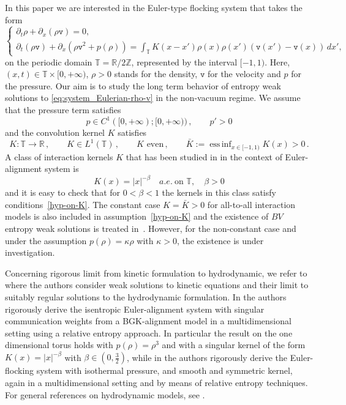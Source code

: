 \documentclass[10pt,reqno]{amsart}
\DeclareMathOperator*{\essinf}{ess\,inf}
\newcommand{\bbt} {\mathbb T}
\newcommand{\R}{\mathbb{R}}
\newcommand{\Z}{\mathbb{Z}}
\newcommand{\vv}{\mathtt v}
\begin{document}
In this paper we are interested in the Euler-type flocking system that takes the form
\begin{equation}\label{eq:system_Eulerian-rho-v}
    \begin{cases}
        \partial_t\rho +  \partial_x (\rho \vv) 
= 0, &\\
\partial_t (\rho\vv)
+  \partial_x \left(\rho\vv^2 + p(\rho) \right) =  \int_\bbt K(x-x')\rho(x)\rho(x')\left(\vv(x')  - \vv(x) \right)
\,dx',
    \end{cases}
\end{equation}
on the periodic domain $\bbt =\R/2\Z$, represented by the interval $[-1,1)$. 
Here, $(x,t)\in\bbt\times[0,+\infty)$, $\rho>0$ stands for the density, $\vv$ for the velocity 
and $p$ for the pressure. Our aim is to study the long term behavior of entropy weak solutions to \eqref{eq:system_Eulerian-rho-v} 
in the non-vacuum regime. We assume that the pressure term satisfies
\begin{equation}\label{hyp-on-p}
  p\in C^1([0,+\infty);[0,+\infty))\,,\qquad  p'>0
\end{equation}
and the convolution kernel $K$ satisfies
\begin{equation}\label{hyp-on-K}
K: \bbt\to \R\,,\qquad K \in L^1(\bbt)\,,\qquad K \mbox{ even}\,,\qquad \bar K:=\essinf_{x\in[-1,1)}K(x)>0\,.
\end{equation}
A class of interaction kernels $K$ that has been studied in \cite{ChHw2024} in the context of Euler-alignment system is 
\begin{equation*}
K(x) = |x|^{-\beta}\quad a.e.\ \mbox{on }\bbt,\quad \beta>0
\end{equation*}
and it is easy to check that for $0<\beta<1$ the kernels in this class satisfy conditions~\eqref{hyp-on-K}.
The constant case $K=\bar  K>0$ for all-to-all interaction models is also included in assumption~\eqref{hyp-on-K} and the existence of $BV$ entropy weak solutions is treated in~\cite{ACC2024}. However, for the non-constant case and under the assumption $p(\rho)= \kappa \rho$ with $\kappa>0$, the existence is under investigation. 

Concerning rigorous limit from kinetic formulation to hydrodynamic, we refer to \cite{ChHw2024,KMT15}
where the authors consider weak solutions to kinetic equations and their limit to suitably regular solutions to the hydrodynamic formulation. In \cite{ChHw2024} the authors rigorously derive the isentropic Euler-alignment system with singular communication weights from a BGK-alignment model in a multidimensional setting using a relative entropy approach. In particular the result on the one dimensional torus holds with $p(\rho)=\rho^3$ 
and with a singular kernel of the form $K(x)=|x|^{-\beta}$ with $\beta\in(0,\tfrac{3}{2})$, while in \cite{KMT15} the authors rigorously derive the Euler-flocking system with isothermal pressure, and smooth and symmetric kernel, again in a multidimensional setting and by means of relative entropy techniques. For general references on hydrodynamic models, see \cite{HT08,Tadmor2023}. 
\end{document}
